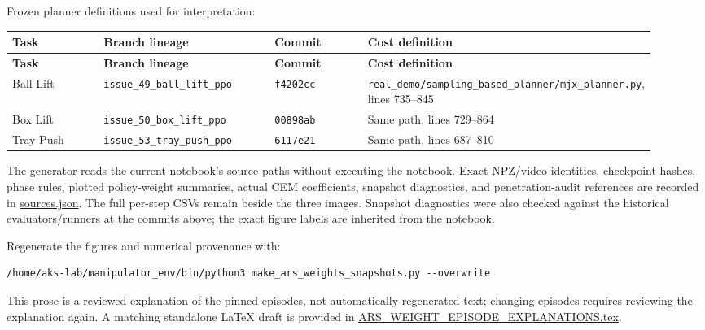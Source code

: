 \documentclass[11pt,a4paper]{article}
\begin{document}
Frozen planner definitions used for interpretation:

\begingroup\small\setlength{\tabcolsep}{4pt}\renewcommand{\arraystretch}{1.2}
\begin{longtable}{@{}p{0.15\linewidth}p{0.27\linewidth}p{0.15\linewidth}p{0.35\linewidth}@{}}
\toprule
\textbf{Task} & \textbf{Branch lineage} & \textbf{Commit} & \textbf{Cost definition} \\
\midrule
\endfirsthead
\toprule
\textbf{Task} & \textbf{Branch lineage} & \textbf{Commit} & \textbf{Cost definition} \\
\midrule
\endhead
\bottomrule
\endfoot
Ball Lift & \texttt{issue\_49\_ball\_lift\_ppo} & \texttt{f4202cc} & \nolinkurl{real_demo/sampling_based_planner/mjx_planner.py}, lines 735--845 \\
Box Lift & \texttt{issue\_50\_box\_lift\_ppo} & \texttt{00898ab} & Same path, lines 729--864 \\
Tray Push & \texttt{issue\_53\_tray\_push\_ppo} & \texttt{6117e21} & Same path, lines 687--810 \\
\end{longtable}
\endgroup

The \href{\detokenize{make_ars_weights_snapshots.py}}{generator} reads the current notebook's source paths without executing the notebook. Exact NPZ/video identities, checkpoint hashes, phase rules, plotted policy-weight summaries, actual CEM coefficients, snapshot diagnostics, and penetration-audit references are recorded in \href{\detokenize{ars_weights_snapshots/sources.json}}{sources.json}. The full per-step CSVs remain beside the three images. Snapshot diagnostics were also checked against the historical evaluators/runners at the commits above; the exact figure labels are inherited from the notebook.

Regenerate the figures and numerical provenance with:

\begin{verbatim}
/home/aks-lab/manipulator_env/bin/python3 make_ars_weights_snapshots.py --overwrite
\end{verbatim}

This prose is a reviewed explanation of the pinned episodes, not automatically regenerated text; changing episodes requires reviewing the explanation again. A matching standalone LaTeX draft is provided in \href{\detokenize{ARS_WEIGHT_EPISODE_EXPLANATIONS.tex}}{ARS\_WEIGHT\_EPISODE\_EXPLANATIONS.tex}.
\end{document}
